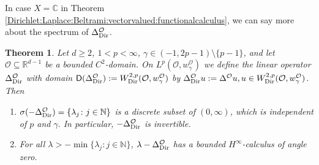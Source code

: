 \documentclass[12pt,a4paper, reqno]{amsart}
\theoremstyle{plain}
\newtheorem{theorem}{Theorem}[section]
\theoremstyle{definition}
\theoremstyle{remark}
\numberwithin{equation}{section}
\newcommand{\1}{\mathbbm{1}}
\newcommand{\R}{\ensuremath{\mathbb{R}}}
\newcommand{\N}{\ensuremath{\mathbb{N}}}
\newcommand{\C}{\ensuremath{\mathbb{C}}}
\newcommand{\calO}{\ensuremath{\mathcal{O}}}
\newcommand{\sfD}{\ensuremath{\mathsf{D}}}
\newcommand{\Dir}{\textup{Dir}}
\begin{document}
In case $X = \C$ in Theorem \ref{Dirichlet:Laplace:Beltrami:vectorvalued:functionalcalculus}, we can say more about the spectrum of $\Delta_{\Dir}^{\calO}$.

 \begin{theorem}\label{Dirichlet:Laplace:Beltrami:functionalcalculus}
     Let $d\ge 2$, $1<p<\infty$, $\gamma\in (-1,2p-1)\setminus\{p-1\}$, and let $\calO\subseteq \R^{d-1}$ be a bounded $C^2$-domain. 
     On $L^p(\calO,w_\gamma^\calO)$ we define the linear operator $\Delta_\Dir^\calO$ with domain $\sfD(\Delta_\Dir^\calO):=W^{2,p}_\Dir(\calO,w_\gamma^\calO)$ by $\Delta_\Dir^\calO u:=\Delta^\calO u, u\in W^{2,p}_\Dir(\calO,w_\gamma^\calO)$. Then
     \begin{enumerate}[label=\textup{(\roman*)}]
        \item\label{it:Dirichlet:Laplace:Beltrami:functionalcalculus:1} $\sigma(-\Delta^\calO_\Dir) = \{\lambda_j\colon j\in\N\}$ is a discrete subset of $(0,\infty)$, which is independent of $p$ and $\gamma.$ In particular, $-\Delta^\calO_\Dir$ is invertible. 
         \item\label{it:Dirichlet:Laplace:Beltrami:functionalcalculus:2} For all $\lambda>-\min\{\lambda_j\colon j\in \N\}$, $\lambda-\Delta^\calO_\Dir$ has a bounded $H^\infty$-calculus of angle zero. 
     \end{enumerate}
 \end{theorem}
\end{document}
